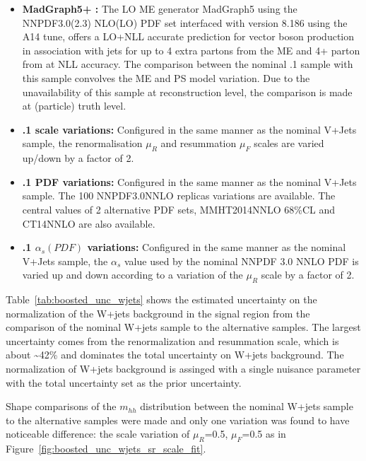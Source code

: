 \begin{itemize}
\item \textbf{MadGraph5+ :} The LO ME generator MadGraph5 using the NNPDF3.0(2.3) NLO(LO) PDF set interfaced
with  version 8.186 using the A14 tune, offers a LO+NLL accurate prediction for vector boson production in association
with jets for up to 4 extra partons from the ME and 4+ parton from  at NLL accuracy. The comparison between the nominal  
.1 sample with this sample convolves the ME and PS model variation. Due to the unavailability of this sample at
reconstruction level, the comparison is made at (particle) truth level.
 
\item \textbf{.1 scale variations:} Configured in the same manner as the nominal V+Jets sample,
the renormalisation $\mu_{R}$ and resummation $\mu_{F}$ scales are varied up/down by a factor of 2.
 
\item \textbf{.1 PDF variations:} Configured in the same manner as the nominal V+Jets sample. The
100 NNPDF3.0NNLO replicas variations are available. The central values of 2 alternative PDF sets, MMHT2014NNLO 68\%CL and CT14NNLO
are also available.
 
\item \textbf{.1 $\alpha_{s}(PDF)$ variations:} Configured in the same manner as the nominal V+Jets sample,
the $\alpha_{s}$ value used by the nominal NNPDF 3.0 NNLO PDF is varied up and down according to a variation of
the $\mu_{R}$ scale by a factor of 2.
\end{itemize}
 
Table~\ref{tab:boosted_unc_wjets} shows the estimated uncertainty on the normalization of the W+jets background in the signal region
from the comparison of the nominal W+jets sample to the alternative samples.  The largest uncertainty comes from the renormalization
and resummation scale, which is about \textasciitilde42\% and dominates the total uncertainty on W+jets background. The normalization of W+jets
background is assinged with a single nuisance parameter with the total uncertainty set as the prior uncertainty.
 
Shape comparisons of the $m_{hh}$ distribution between the nominal W+jets sample to the alternative samples were made and only one
variation was found to have noticeable difference: the scale variation of $\mu_{R}$=0.5, $\mu_{F}$=0.5 as in Figure~\ref{fig:boosted_unc_wjets_sr_scale_fit}.
 

